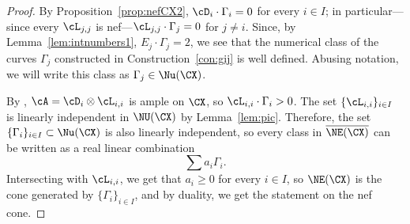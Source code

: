 \documentclass[11pt]{amsart}
\numberwithin{equation}{section}
\theoremstyle{definition}
\theoremstyle{remark}
\begin{document}
\begin{proof} By Proposition~\ref{prop:nefCX2},  $\cD_i \cdot \Gamma_i=0$ for every $i \in I$; in particular---since every $\cL_{j,j}$ is nef---$\cL_{j,j}\cdot \Gamma_j=0$ for $j\neq i$. Since, by Lemma~\ref{lem:intnumbers1}, $E_j \cdot \Gamma_j=2$, we see that the numerical class of the curves $\Gamma_j$ constructed in Construction~\ref{con:gij} is well defined. Abusing notation, we will write this class as $\Gamma_j\in\Nu(\CX)$.

By \cite[Lemma 6.4]{WORS6}, $\cA=\cD_i \otimes \cL_{i,i}$ is ample on $\CX$, so $\cL_{i,i} \cdot \Gamma_i >0$. 
The set $\{\cL_{i,i}\}_{i \in I}$ is linearly independent in $\NU(\CX)$ by Lemma~\ref{lem:pic}. Therefore, the set $\{\Gamma_i\}_{i \in I}\subset \Nu(\CX)$ is also linearly independent, so every class in $\overline{\NE(\CX)}$ can be written as a real linear combination 
\[
\sum a_i\Gamma_i.
\]
Intersecting with $\cL_{i,i}$, we get that $a_i \ge 0$ for every $i \in I$, so $\NE(\CX)$ is the cone generated by  $\{\Gamma_i\}_{i \in I}$, and by duality,  we get the statement on the nef cone.
\end{proof}
\end{document}
